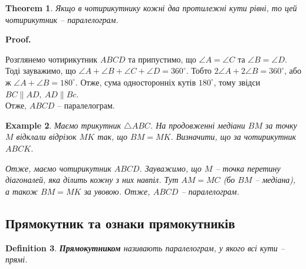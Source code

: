 \documentclass[a4paper, 10pt]{article}
\makeatletter
\def\qed{$\blacksquare$}
\theoremstyle{theoremdd}
\newtheorem{theorem}{Theorem}[subsection]
\theoremstyle{theoremdd}
\theoremstyle{theoremdd}
\newtheorem{definition}[theorem]{Definition}
\theoremstyle{theoremdd}
\theoremstyle{theoremdd}
\newtheorem{example}[theorem]{Example}
\theoremstyle{theoremdd}
\theoremstyle{theoremdd}
\theoremstyle{theoremdd}
\theoremstyle{theoremdd}
\renewenvironment{proof}[1][Proof.\\]{\par
\pushQED{\hfill \qed}%
\normalfont \topsep6\p@\@plus6\p@\relax
\trivlist
\item\relax
{\bfseries
#1\@addpunct{.}}\hspace\labelsep\ignorespaces
}{%
\popQED\endtrivlist\@endpefalse
}
\makeatother
\begin{document}
\begin{theorem}
Якщо в чотирикутнику кожні два протилежні кути рівні, то цей чотирикутник -- паралелограм.
\end{theorem}

\begin{proof}
Розглянемо чотирикутник $ABCD$ та припустимо, що $\angle A = \angle C$ та $\angle B = \angle D$. Тоді зауважимо, що $\angle A + \angle B + \angle C + \angle D = 360^\circ$. Тобто $2 \angle A + 2 \angle B = 360^\circ$, або ж $\angle A + \angle B = 180^\circ$. Отже, сума односторонніх кутів $180^\circ$, тому звідси $BC \parallel AD,\ AD \parallel Bc$.\\
Отже, $ABCD$ -- паралелограм.
\end{proof}

\begin{example}
\label{create_parallelogram_through_triangle_and_median}
Маємо трикутник $\triangle ABC$. На продовженні медіани $BM$ за точку $M$ відклали відрізок $MK$ так, що $BM = MK$. Визначити, що за чотирикутник $ABCK$.
\begin{figure}[H]
\centering
{}
\end{figure}
Отже, маємо чотирикутник $ABCD$. Зауважимо, що $M$ -- точка перетину діагоналей, яка ділить кожну з них навпіл. Тут $AM = MC$ (бо $BM$ -- медіана), а також $BM = MK$ за увовою. Отже, $ABCD$ -- паралелограм.
\end{example}

\subsection{Прямокутник та ознаки прямокутників}
\begin{definition}
\textbf{Прямокутником} називають паралелограм, у якого всі кути -- прямі.
\begin{figure}[H]
\centering
{}
\end{figure}
\end{definition}
\end{document}
